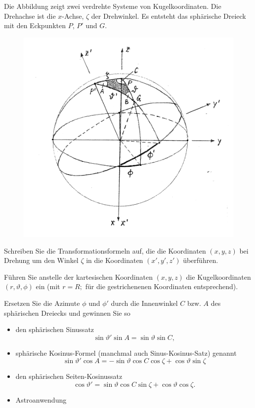 \begin{atiTask}[
  title = Sphärische Trigonometrie
]



Die Abbildung zeigt zwei verdrehte Systeme von Kugelkoordinaten. Die Drehachse ist die $x$-Achse, $\zeta$ der Drehwinkel. Es entsteht das sphärische Dreieck mit den Eckpunkten $P$, $P'$ und $G$.
\begin{figure}
\centering
\includegraphics[width=0.6\linewidth]{./Trigonometrie}
\label{fig:Trigonometrie}
\end{figure}


\begin{atiSubtasks}
\item Schreiben Sie die Transformationsformeln auf, die die Koordinaten $(x,y,z)$ bei Drehung um den Winkel $\zeta$ in die Koordinaten $(x',y',z')$ überführen.
\item Führen Sie anstelle der kartesischen Koordinaten $(x,y,z)$ die Kugelkoordinaten $(r,\vartheta,\phi)$ ein (mit $r=R;$ für die gestrichenenen Koordinaten entsprechend).
\item Ersetzen Sie die Azimute $\phi$ und $\phi'$ durch die Innenwinkel $C$ bzw. $A$ des sphärischen Dreiecks und gewinnen Sie so
\begin{itemize}
\item den sphärischen Sinussatz
\[
\sin\vartheta'\sin A=\sin \vartheta \sin C,
\]
\item sphärische Kosinus-Formel (manchmal auch Sinus-Kosinus-Satz) genannt
\[
\sin \vartheta'\cos A=-\sin \vartheta \cos C\cos \zeta+\cos \vartheta\sin \zeta
\]
\item den sphärischen Seiten-Kosinussatz
\[
\cos \vartheta'=\sin\vartheta \cos C\sin\zeta+\cos \vartheta\cos \zeta.
\]
\item Astroanwendung
\end{itemize}
\end{atiSubtasks}
\end{atiTask}
